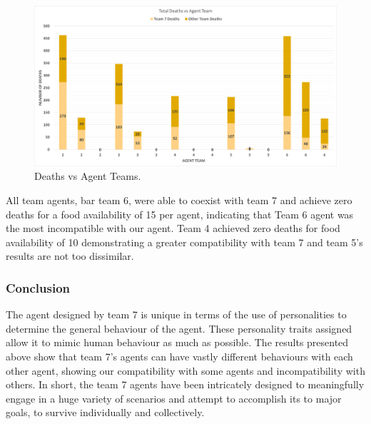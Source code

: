 \begin{figure}[H]
    \begin{center}
        \includegraphics[scale=0.4]{009_team_7_agent_design/Images/Chart.png}
    \end{center}
    \caption{Deaths vs Agent Teams.}
    \label{fig: agent deaths}
\end{figure}

All team agents, bar team 6, were able to coexist with team 7 and achieve zero deaths for a food availability of 15 per agent, indicating that Team 6 agent was the most incompatible with our agent. Team 4 achieved zero deaths for food availability of 10 demonstrating a greater compatibility with team 7 and team 5's results are not too dissimilar.  

\subsubsection{Conclusion}
The agent designed by team 7 is unique in terms of the use of personalities to determine the general behaviour of the agent. These personality traits assigned allow it to mimic human behaviour as much as possible. The results presented above show that team 7's agents can have vastly different behaviours with each other agent, showing our compatibility with some agents and incompatibility with others. In short, the team 7 agents have been intricately designed to meaningfully engage in a huge variety of scenarios and attempt to accomplish its to major goals, to survive individually and collectively.